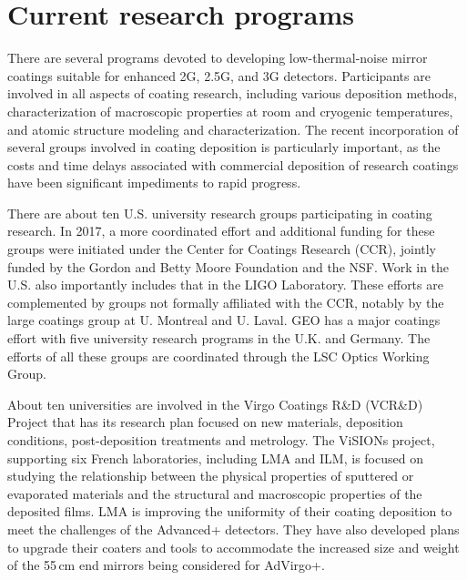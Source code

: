 \section{Current research programs}

There are several 
programs devoted to developing low-thermal-noise mirror coatings suitable for enhanced 2G, 2.5G, and 3G detectors. Participants are involved in all aspects of coating research, including various deposition methods, characterization of macroscopic properties at room and cryogenic temperatures, and atomic structure modeling and characterization. The recent incorporation 
of several groups involved in coating deposition is particularly important, as the costs and time delays associated with commercial deposition of research coatings have been significant impediments to rapid progress.

There are about ten U.S. university research groups participating in 
coating research. In 2017, a more coordinated effort and additional funding for these groups were initiated under the Center for Coatings Research (CCR), jointly funded by the Gordon and Betty Moore Foundation and the NSF. Work in the U.S. also importantly includes that in the LIGO Laboratory. These efforts are complemented by groups not formally affiliated with the CCR, notably by the large coatings group at U. Montreal and U. Laval. GEO has a major coatings effort with five university research programs in the U.K. and Germany. 
The efforts of all these groups are coordinated through 
the LSC Optics Working Group.

About ten universities are involved in the Virgo Coatings R\&D (VCR\&D) Project that has its research plan focused on new materials, deposition conditions, post-deposition treatments and metrology. The ViSIONs project, supporting six French laboratories, including LMA and ILM, is focused on studying the relationship between the physical properties of sputtered or evaporated materials and the structural and macroscopic properties of the deposited films. 
LMA is improving the uniformity of their coating deposition to meet the challenges of the Advanced+ detectors. They have also developed plans to upgrade their coaters and tools to accommodate the increased size and weight of the 55\,cm end mirrors being considered for AdVirgo+.


